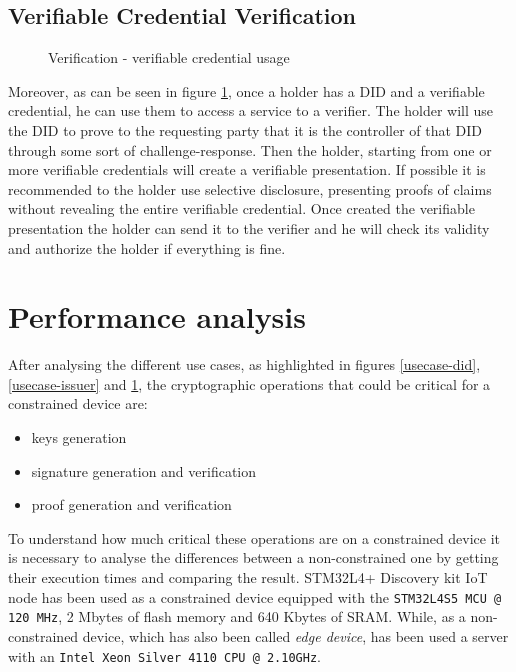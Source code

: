 \subsection{Verifiable Credential Verification}
\begin{figure}[!h]
    \centering
    
    \caption{Verification - verifiable credential usage}
    \label{usecase-verifier}
\end{figure}

Moreover, as can be seen in figure \ref{usecase-verifier}, once a holder has a DID and a verifiable credential, he can use them to access a service to a verifier. The holder will use the DID to prove to the requesting party that it is the controller of that DID through some sort of challenge-response. Then the holder, starting from one or more verifiable credentials will create a verifiable presentation. If possible it is recommended to the holder use selective disclosure, presenting proofs of claims without revealing the entire verifiable credential. Once created the verifiable presentation the holder can send it to the verifier and he will check its validity and authorize the holder if everything is fine.  
\section{Performance analysis}
After analysing the different use cases, as highlighted in figures \ref{usecase-did}, \ref{usecase-issuer} and \ref{usecase-verifier}, the cryptographic operations that could be  critical for a constrained device are:
\begin{itemize}
    \item keys generation
    \item signature generation and verification
    \item proof generation and verification
\end{itemize}

To understand how much critical these operations are on a constrained device it is necessary to analyse the differences between a non-constrained one by getting their execution times and comparing the result. 
STM32L4+ Discovery kit IoT node\cite{stm32-board-product} has been used as a constrained device equipped with the \texttt{STM32L4S5 MCU @ 120 MHz}, 2 Mbytes of flash memory and 640 Kbytes of SRAM. While, as a non-constrained device, which has also been called \textit{edge device}, has been used a server with an \texttt{Intel Xeon Silver 4110 CPU @ 2.10GHz}. 

